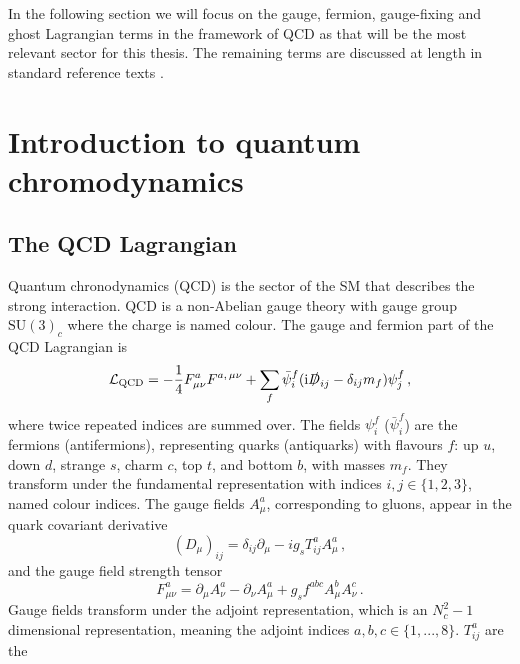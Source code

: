 \documentclass[main.tex]{subfiles}
\begin{document}
    In the following section we will focus on the gauge, fermion, gauge-fixing
    and ghost Lagrangian terms in the framework of QCD as that will be the
    most relevant sector for this thesis. The remaining terms are discussed at
    length in standard reference texts \cite{Peskin:1995ev,Schwartz:2014sze,Romao:2012pq}.


\section{Introduction to quantum chromodynamics}\label{sec:qcd}
    \subsection{The QCD Lagrangian}\label{sec:L_qcd}
    Quantum chronodynamics (QCD) is the sector of the SM that
    describes the strong interaction. 
    QCD is a non-Abelian gauge theory with gauge group
    $\mathrm{SU}(3)_{c}$ where the charge is named colour.
    The gauge and fermion part of the QCD Lagrangian is
    \begin{equation}\label{eqn:L_QCD}
        \mathcal{L}_{\mathrm{QCD}} = -\dfrac{1}{4}F^{a}_{\mu\nu}F^{a, \, \mu\nu}
        + \sum_{f} \bar{\psi}_{i}^{f}(\mathrm{i}\slashed{D}_{ij} - \delta_{ij}m_{f})\psi_{j}^{f} \, ,
    \end{equation}
    where twice repeated indices are summed over.
    The fields $\psi_{i}^{f}$ ($\bar{\psi}_{i}^{f}$) are the fermions (antifermions),
    representing quarks (antiquarks) with flavours $f$: 
    up $u$, down $d$, strange $s$, charm $c$, top $t$, and bottom $b$,
    with masses $m_{f}$. They transform under the fundamental
    representation with indices $i, j \in \{1, 2, 3\}$, named colour indices.
    The gauge fields $A^{a}_{\mu}$, corresponding to gluons, 
    appear in the quark covariant derivative
    \begin{equation}\label{eqn:covariant_deriv}
        (D_{\mu})_{ij} = \delta_{ij}\partial_{\mu} - ig_{s}T^{a}_{ij}A^{a}_{\mu} \, ,
    \end{equation}
    and the gauge field strength tensor
    \begin{equation}\label{eqn:F_munu}
        F^{a}_{\mu\nu} = \partial_{\mu}A^{a}_{\nu} - \partial_{\nu}A^{a}_{\mu} + g_{s} f^{abc}A^{b}_{\mu}A^{c}_{\nu} \, .
    \end{equation}
    Gauge fields transform under the adjoint representation, 
    which is an $N_{c}^{2}-1$ dimensional representation, meaning
    the adjoint indices $a,b,c \in \{1,...,8\}$. $T^{a}_{ij}$ are the
\end{document}
